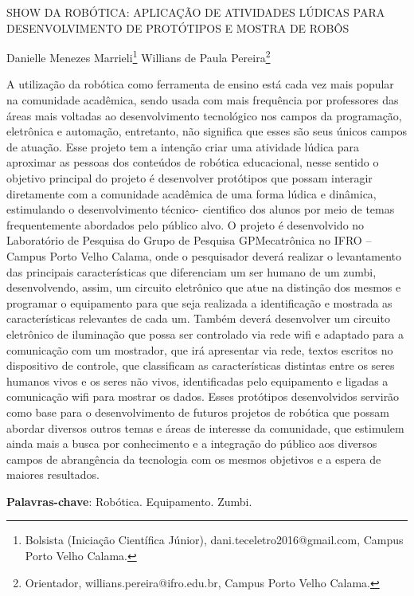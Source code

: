 \documentclass[article,12pt,onesidea,4paper,english,brazil]{abntex2}
\begin{document}
	
	
	\frenchspacing 
	
	\begin{center}
		\LARGE SHOW DA ROBÓTICA: APLICAÇÃO DE ATIVIDADES LÚDICAS PARA DESENVOLVIMENTO DE PROTÓTIPOS E MOSTRA DE ROBÔS
		
		\normalsize
		Danielle Menezes Marrieli\footnote{Bolsista (Iniciação Científica Júnior), dani.teceletro2016@gmail.com, Campus Porto Velho Calama.} 
		Willians de Paula Pereira\footnote{Orientador, willians.pereira@ifro.edu.br, Campus Porto Velho Calama.} 
	\end{center}
	
	\noindent A utilização da robótica como ferramenta de ensino está cada vez mais popular na
	comunidade acadêmica, sendo usada com mais frequência por professores das áreas
	mais voltadas ao desenvolvimento tecnológico nos campos da programação,
	eletrônica e automação, entretanto, não significa que esses são seus únicos campos
	de atuação. Esse projeto tem a intenção criar uma atividade lúdica para aproximar as
	pessoas dos conteúdos de robótica educacional, nesse sentido o objetivo principal do
	projeto é desenvolver protótipos que possam interagir diretamente com a comunidade	
	acadêmica de uma forma lúdica e dinâmica, estimulando o desenvolvimento técnico-
	cientifico dos alunos por meio de temas frequentemente abordados pelo público alvo.	
	O projeto é desenvolvido no Laboratório de Pesquisa do Grupo de Pesquisa
	GPMecatrônica no IFRO – Campus Porto Velho Calama, onde o pesquisador deverá
	realizar o levantamento das principais características que diferenciam um ser humano
	de um zumbi, desenvolvendo, assim, um circuito eletrônico que atue na distinção dos
	mesmos e programar o equipamento para que seja realizada a identificação e
	mostrada as características relevantes de cada um. Também deverá desenvolver um
	circuito eletrônico de iluminação que possa ser controlado via rede wifi e adaptado
	para a comunicação com um mostrador, que irá apresentar via rede, textos escritos
	no dispositivo de controle, que classificam as características distintas entre os seres
	humanos vivos e os seres não vivos, identificadas pelo equipamento e ligadas a
	comunicação wifi para mostrar os dados. Esses protótipos desenvolvidos servirão
	como base para o desenvolvimento de futuros projetos de robótica que possam
	abordar diversos outros temas e áreas de interesse da comunidade, que estimulem
	ainda mais a busca por conhecimento e a integração do público aos diversos campos
	de abrangência da tecnologia com os mesmos objetivos e a espera de maiores
	resultados.
	
	\vspace{\onelineskip}
	
	\noindent
	\textbf{Palavras-chave}: Robótica. Equipamento. Zumbi.
	
\end{document}
